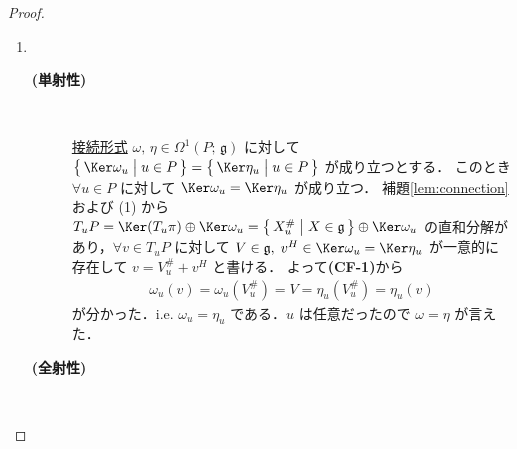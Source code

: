 \documentclass[geometry_main]{subfiles}
\begin{document}
\begin{proof}
\begin{enumerate}
        \item　
        
        \begin{description}
            \item[\textbf{(単射性)}]　
            
            \hyperref[def:connection]{接続形式} $\omega,\, \eta \in \Omega^1(P;\, \mathfrak{g})$ に対して $\bigl\{\, \Ker \omega_u \bigm| u \in P \,\bigr\} = \bigl\{\, \Ker \eta_u \bigm| u \in P \,\bigr\}$ が成り立つとする．
            このとき $\forall u \in P$ に対して $\Ker \omega_u = \Ker \eta_u$ が成り立つ．
            補題\ref{lem:connection}および (1) から $T_u P = \Ker (T_u \pi) \oplus \Ker \omega_u = \bigl\{\, X^\#_u \bigm| X \in \mathfrak{g} \,\bigr\} \oplus \Ker \omega_u$ の直和分解があり，$\forall v \in T_u P$ に対して $V \in \mathfrak{g},\; v^H \in \Ker \omega_u = \Ker \eta_u$ が一意的に存在して $v = V^\#_u + v^H$ と書ける．
            よって\textbf{\textsf{(CF-1)}}から
            \begin{align}
                \omega_u(v) = \omega_u(V^\#_u) = V = \eta_u(V^\#_u) = \eta_u(v)
            \end{align}
            が分かった．i.e. $\omega_u = \eta_u$ である．$u$ は任意だったので $\omega = \eta$ が言えた．

            \item[\textbf{(全射性)}]　
            

\end{description}
\end{enumerate}
\end{proof}
\end{document}
